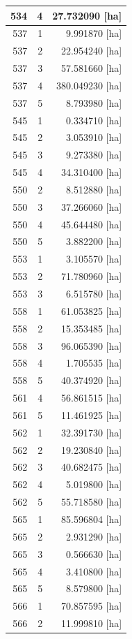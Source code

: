 \documentclass[11pt,]{book}
\begin{document}
\begin{table}
\begin{tabular}[t]{r|r|r}
\hline
534 & 4 & 27.732090 [ha]\\
\hline
537 & 1 & 9.991870 [ha]\\
\hline
537 & 2 & 22.954240 [ha]\\
\hline
537 & 3 & 57.581660 [ha]\\
\hline
537 & 4 & 380.049230 [ha]\\
\hline
537 & 5 & 8.793980 [ha]\\
\hline
545 & 1 & 0.334710 [ha]\\
\hline
545 & 2 & 3.053910 [ha]\\
\hline
545 & 3 & 9.273380 [ha]\\
\hline
545 & 4 & 34.310400 [ha]\\
\hline
550 & 2 & 8.512880 [ha]\\
\hline
550 & 3 & 37.266060 [ha]\\
\hline
550 & 4 & 45.644480 [ha]\\
\hline
550 & 5 & 3.882200 [ha]\\
\hline
553 & 1 & 3.105570 [ha]\\
\hline
553 & 2 & 71.780960 [ha]\\
\hline
553 & 3 & 6.515780 [ha]\\
\hline
558 & 1 & 61.053825 [ha]\\
\hline
558 & 2 & 15.353485 [ha]\\
\hline
558 & 3 & 96.065390 [ha]\\
\hline
558 & 4 & 1.705535 [ha]\\
\hline
558 & 5 & 40.374920 [ha]\\
\hline
561 & 4 & 56.861515 [ha]\\
\hline
561 & 5 & 11.461925 [ha]\\
\hline
562 & 1 & 32.391730 [ha]\\
\hline
562 & 2 & 19.230840 [ha]\\
\hline
562 & 3 & 40.682475 [ha]\\
\hline
562 & 4 & 5.019800 [ha]\\
\hline
562 & 5 & 55.718580 [ha]\\
\hline
565 & 1 & 85.596804 [ha]\\
\hline
565 & 2 & 2.931290 [ha]\\
\hline
565 & 3 & 0.566630 [ha]\\
\hline
565 & 4 & 3.410800 [ha]\\
\hline
565 & 5 & 8.579800 [ha]\\
\hline
566 & 1 & 70.857595 [ha]\\
\hline
566 & 2 & 11.999810 [ha]\\

\end{tabular}
\end{table}
\end{document}
